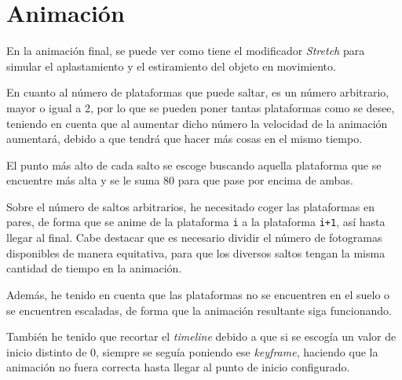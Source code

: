 \section{Animación}

En la animación final, se puede ver como tiene el modificador \textit{Stretch} para simular el aplastamiento y el estiramiento del objeto en movimiento. 


En cuanto al número de plataformas que puede saltar, es un número arbitrario, mayor o igual a 2, por lo que se pueden poner tantas plataformas como se desee, teniendo en cuenta que al aumentar dicho número la velocidad de la animación aumentará, debido a que tendrá que hacer más cosas en el mismo tiempo.

\bigskip

El punto más alto de cada salto se escoge buscando aquella plataforma que se encuentre más alta y se le suma 80 para que pase por encima de ambas.

\bigskip

Sobre el número de saltos arbitrarios, he necesitado coger las plataformas en pares, de forma que se anime de la plataforma \verb|i| a la plataforma \verb|i+1|, así hasta llegar al final. Cabe destacar que es necesario dividir el número de fotogramas disponibles de manera equitativa, para que los diversos saltos tengan la misma cantidad de tiempo en la animación.

\bigskip

Además, he tenido en cuenta que las plataformas no se encuentren en el suelo o se encuentren escaladas, de forma que la animación resultante siga funcionando.

\bigskip

También he tenido que recortar el \textit{timeline} debido a que si se escogía un valor de inicio distinto de 0, siempre se seguía poniendo ese \textit{keyframe}, haciendo que la animación no fuera correcta hasta llegar al punto de inicio configurado.